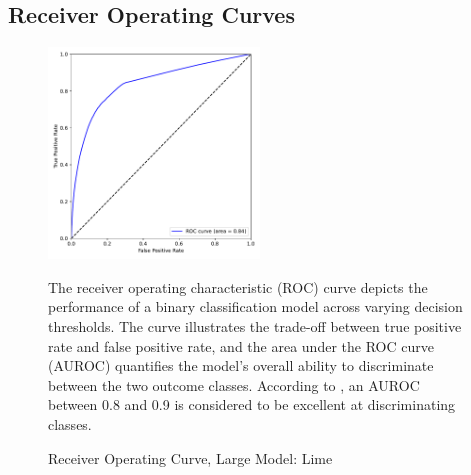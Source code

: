\documentclass[12pt]{article}
\begin{document}
\subsection{Receiver Operating Curves}
\label{sec:roc_curves}
\begin{figure}[H]
    \centering
    \caption{Receiver Operating Curve, Large Model: Lime}
    \includegraphics[width=0.5\textwidth]{../output/lightgbm_roc_lime.pdf}
    \begin{minipage}{0.6\textwidth}
    \tiny
    The receiver operating characteristic (ROC) curve depicts the performance of a binary classification model across varying decision thresholds. The curve illustrates the trade-off between true positive rate and false positive rate, and the area under the ROC curve (AUROC) quantifies the model's overall ability to discriminate between the two outcome classes. According to \textcite{mandrekar_receiver_2010}, an AUROC between 0.8 and 0.9 is considered to be excellent at discriminating classes.
    \end{minipage}
    \label{fig:roc_lime}
\end{figure}
\end{document}
